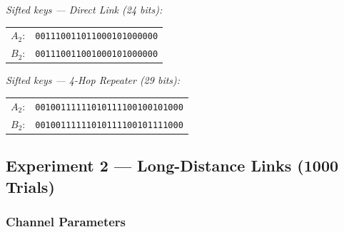 \documentclass[12pt,oneside,letterpaper,english]{article}
\begin{document}
\noindent\textit{Sifted keys --- Direct Link (24 bits):}

\begin{center}
\begin{tabular}{ll}
$A_2$: & \texttt{001110011011000101000000} \\
$B_2$: & \texttt{001110011001000101000000}
\end{tabular}
\end{center}

\noindent\textit{Sifted keys --- 4-Hop Repeater (29 bits):}

\begin{center}
\begin{tabular}{ll}
$A_2$: & \texttt{00100111111010111100100101000} \\
$B_2$: & \texttt{00100111111010111100101111000}
\end{tabular}
\end{center}

\subsection{Experiment 2 --- Long-Distance Links (1000 Trials)}

\subsubsection{Channel Parameters}
\end{document}

